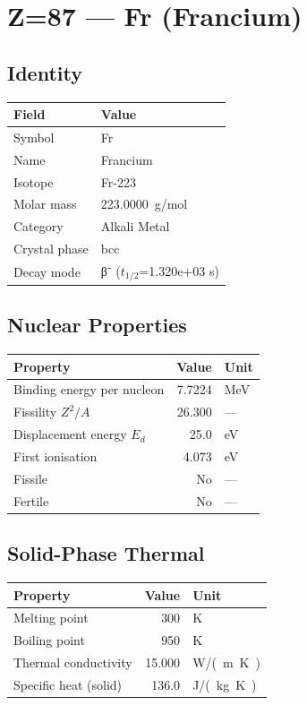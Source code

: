 \documentclass[11pt,a4paper]{article}
\begin{document}
\newpage

\section{Z=87 --- Fr (Francium)}
\label{sec:Z87}

\subsection{Identity}
\begin{tabular}{ll}
  \toprule
  Field & Value \\
  \midrule
  Symbol & Fr \\
  Name & Francium \\
  Isotope & Fr-223 \\
  Molar mass & \SI{223.0000}{g/mol} \\
  Category & Alkali Metal \\
  Crystal phase & bcc \\
  Decay mode & β⁻ ($t_{1/2}$=1.320e+03 s) \\
  \bottomrule
\end{tabular}

\subsection{Nuclear Properties}
\begin{tabular}{lrl}
  \toprule
  Property & Value & Unit \\
  \midrule
  Binding energy per nucleon & 7.7224 & \si{MeV} \\
  Fissility $Z^2/A$ & 26.300 & --- \\
  Displacement energy $E_d$ & 25.0 & \si{eV} \\
  First ionisation & 4.073 & \si{eV} \\
  Fissile & No & --- \\
  Fertile & No & --- \\
  \bottomrule
\end{tabular}

\subsection{Solid-Phase Thermal}
\begin{tabular}{lrl}
  \toprule
  Property & Value & Unit \\
  \midrule
  Melting point & 300 & \si{K} \\
  Boiling point & 950 & \si{K} \\
  Thermal conductivity & 15.000 & \si{W/(m.K)} \\
  Specific heat (solid) & 136.0 & \si{J/(kg.K)} \\
  \bottomrule
\end{tabular}
\end{document}
